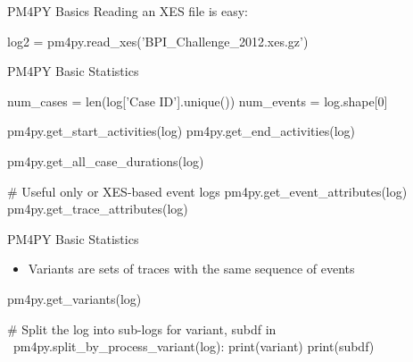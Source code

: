 \documentclass[ignorenonframetext,xcolor=x11names]{beamer}
\begin{document}
\begin{frame}[fragile]{PM4PY Basics}
Reading an XES file is easy:
\footnotesize
\begin{pythoncode}
log2 = pm4py.read_xes('BPI_Challenge_2012.xes.gz')
\end{pythoncode}
\end{frame}

\begin{frame}[fragile]{PM4PY Basic Statistics}
\footnotesize
\begin{pythoncode}
num_cases = len(log['Case ID'].unique())
num_events = log.shape[0]

pm4py.get_start_activities(log)
pm4py.get_end_activities(log)

pm4py.get_all_case_durations(log)

# Useful only or XES-based event logs
pm4py.get_event_attributes(log)
pm4py.get_trace_attributes(log)
\end{pythoncode}
\end{frame}





\begin{frame}[fragile]{PM4PY Basic Statistics}
\begin{itemize}
   \item Variants are sets of traces with the same sequence of events
\end{itemize}
\footnotesize
\begin{pythoncode}
pm4py.get_variants(log)

# Split the log into sub-logs
for variant, subdf in \
pm4py.split_by_process_variant(log):
    print(variant)
    print(subdf)  
\end{pythoncode}
\end{frame}
\end{document}
